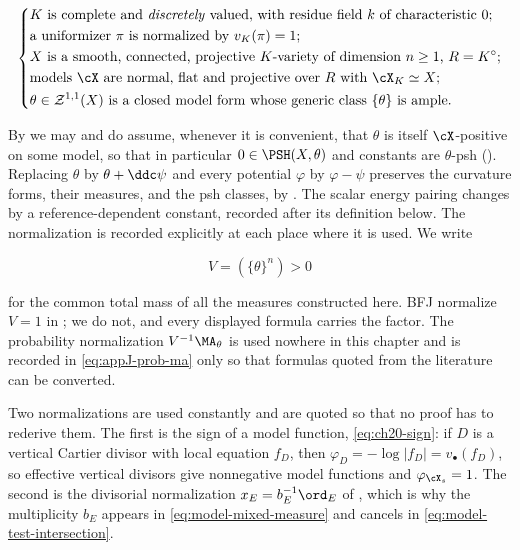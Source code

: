 \begin{equation}
\label{eq:ch24-standing}
\left\{
\begin{aligned}
 &\text{$K$ is complete and \emph{discretely} valued, with residue field
   $k$ of characteristic $0$;}\\
 &\text{a uniformizer $\pi$ is normalized by $v_K(\pi)=1$; }\\
 &\text{$X$ is a smooth, connected, projective $K$-variety of dimension
   $n\geq1$, $R=K^\circ$;}\\
 &\text{models $\cX$ are normal, flat and projective over $R$ with
   $\cX_K\simeq X$;}\\
 &\text{$\theta\in\mathcal Z^{1,1}(X)$ is a closed model form whose generic
   class $\{\theta\}$ is ample.}
\end{aligned}
\right.
\end{equation}

By  we may and do assume, whenever it
is convenient, that $\theta$ is itself $\cX$-positive on some model, so
that in particular $0\in\PSH(X,\theta)$ and constants are
$\theta$-psh ().  Replacing $\theta$ by
$\theta+\ddc\psi$ and every potential $\varphi$ by $\varphi-\psi$
preserves the curvature forms, their measures, and the psh classes, by
.  The scalar energy pairing changes
by a reference-dependent constant, recorded after its definition below.
The normalization is recorded explicitly at each place where it is used.  We write

\begin{equation}
\label{eq:ch24-volume}
                V=(\{\theta\}^n)>0
\end{equation}

for the common total mass of all the measures constructed here.  BFJ
normalize $V=1$ in \cite{BFJ15}; we do not, and every displayed formula
carries the factor.  The probability normalization $V^{-1}\MA_\theta$ is
used nowhere in this chapter and is recorded in
\eqref{eq:appJ-prob-ma} only so that formulas quoted from the literature can
be converted.

Two normalizations are used constantly and are quoted so that no proof has
to rederive them.  The first is the sign of a model function,
\eqref{eq:ch20-sign}: if $D$ is a vertical Cartier divisor with local
equation $f_D$, then $\varphi_D=-\log|f_D|=v_\bullet(f_D)$, so effective
vertical divisors give nonnegative model functions and
$\varphi_{\cX_s}=1$.  The second is the divisorial normalization
$x_E=b_E^{-1}\ord_E$ of , which is why
the multiplicity $b_E$ appears in \eqref{eq:model-mixed-measure} and
cancels in \eqref{eq:model-test-intersection}.

